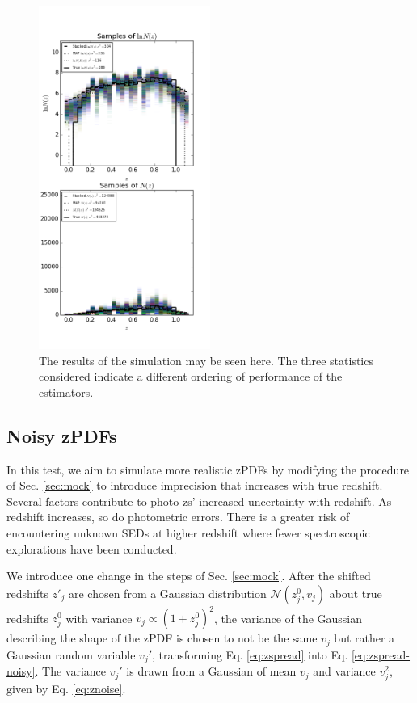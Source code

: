 \documentclass[preprint]{aastex}
\begin{document}
\begin{figure}
\includegraphics[width=0.5\textwidth]{samps-real.png}
\caption{The results of the simulation may be seen here.  The three statistics 
considered indicate a different ordering of performance of the estimators.}
\label{fig:nullparam}
\end{figure}

\clearpage
\subsection{Noisy zPDFs}
\label{sec:noisy}

In this test, we aim to simulate more realistic zPDFs by modifying the 
procedure of Sec. \ref{sec:mock} to introduce imprecision that increases with 
true redshift.  Several factors contribute to photo-zs' increased uncertainty 
with redshift.  As redshift increases, so do photometric errors.  There is a 
greater risk of encountering unknown SEDs at higher redshift where fewer 
spectroscopic explorations have been conducted.  

We introduce one change in the steps of Sec. \ref{sec:mock}.  After the shifted 
redshifts $z'_{j}$ are chosen from a Gaussian distribution 
$\mathcal{N}(z_{j}^{0},v_{j})$ about true redshifts $z_{j}^{0}$ with variance 
$v_{j}\propto(1+z_{j}^{0})^{2}$, the variance of the Gaussian describing the 
shape of the zPDF is chosen to not be the same $v_{j}$ but rather a Gaussian 
random variable $v_{j}'$, transforming Eq. \ref{eq:zspread} into Eq. 
\ref{eq:zspread-noisy}.  The variance $v_{j}'$ is drawn from a Gaussian of mean 
$v_{j}$ and variance $v_{j}^{2}$, given by Eq. \ref{eq:znoise}.
\end{document}

